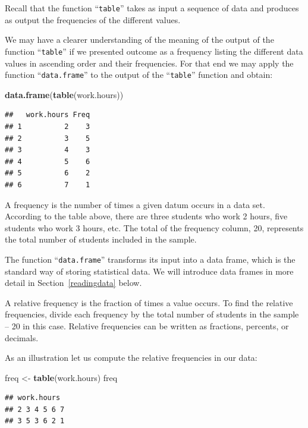 \documentclass[
]{krantz}
\makeatletter
\newenvironment{Shaded}{\begin{snugshade}}{\end{snugshade}}
\newcommand{\KeywordTok}[1]{\textcolor[rgb]{0.13,0.29,0.53}{\textbf{#1}}}
\newcommand{\NormalTok}[1]{#1}
\newcommand{\StringTok}[1]{\textcolor[rgb]{0.31,0.60,0.02}{#1}}
\newenvironment{kframe}{%
\medskip{}
\setlength{\fboxsep}{.8em}
 \def\at@end@of@kframe{}%
 \ifinner\ifhmode%
  \def\at@end@of@kframe{\end{minipage}}%
  \begin{minipage}{\columnwidth}%
 \fi\fi%
 \def\FrameCommand##1{\hskip\@totalleftmargin \hskip-\fboxsep
 \colorbox{shadecolor}{##1}\hskip-\fboxsep
     \hskip-\linewidth \hskip-\@totalleftmargin \hskip\columnwidth}%
 \MakeFramed {\advance\hsize-\width
   \@totalleftmargin\z@ \linewidth\hsize
   \@setminipage}}%
 {\par\unskip\endMakeFramed%
 \at@end@of@kframe}
\renewenvironment{Shaded}{\begin{kframe}}{\end{kframe}}
\theoremstyle{definition}
\theoremstyle{definition}
\theoremstyle{definition}
\theoremstyle{remark}
\makeatother
\begin{document}
Recall that the function ``\texttt{table}'' takes as input a sequence of data and produces as output the frequencies of the different values.

We may have a clearer understanding of the meaning of the output of the function ``\texttt{table}'' if we presented outcome as a frequency listing the different data values in ascending order and their frequencies. For that end we may apply the function ``\texttt{data.frame}'' to the output of the ``\texttt{table}'' function and obtain:

\begin{Shaded}
\begin{Highlighting}[]
\KeywordTok{data.frame}\NormalTok{(}\KeywordTok{table}\NormalTok{(work.hours))}
\end{Highlighting}
\end{Shaded}

\begin{verbatim}
##   work.hours Freq
## 1          2    3
## 2          3    5
## 3          4    3
## 4          5    6
## 5          6    2
## 6          7    1
\end{verbatim}

A frequency is the number of times a given datum occurs in a data set. According to the table above, there are three students who work 2 hours, five students who work 3 hours, etc. The total of the frequency column, 20, represents the total number of students included in the sample.

The function ``\texttt{data.frame}'' transforms its input into a data frame, which is the standard way of storing statistical data. We will introduce data frames in more detail in Section~\ref{readingdata} below.

A relative frequency is the fraction of times a value occurs. To find the relative frequencies, divide each frequency by the total number of students in the sample -- 20 in this case. Relative frequencies can be written as fractions, percents, or decimals.

As an illustration let us compute the relative frequencies in our data:

\begin{Shaded}
\begin{Highlighting}[]
\NormalTok{freq <-}\StringTok{ }\KeywordTok{table}\NormalTok{(work.hours)}
\NormalTok{freq}
\end{Highlighting}
\end{Shaded}

\begin{verbatim}
## work.hours
## 2 3 4 5 6 7 
## 3 5 3 6 2 1
\end{verbatim}
\end{document}
